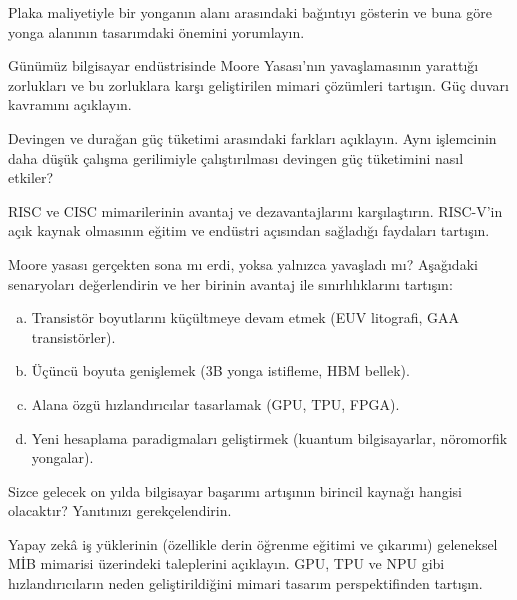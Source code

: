 \begin{alistirma}[\orta]
Plaka maliyetiyle bir yonganın alanı arasındaki bağıntıyı gösterin ve buna göre yonga alanının tasarımdaki önemini yorumlayın.
\end{alistirma}

\begin{alistirma}[\zor]
Günümüz bilgisayar endüstrisinde Moore Yasası'nın yavaşlamasının yarattığı zorlukları ve bu zorluklara karşı geliştirilen mimari çözümleri tartışın. Güç duvarı kavramını açıklayın.
\end{alistirma}

\begin{alistirma}[\orta]
Devingen ve durağan güç tüketimi arasındaki farkları açıklayın. Aynı işlemcinin daha düşük çalışma gerilimiyle çalıştırılması devingen güç tüketimini nasıl etkiler?
\end{alistirma}

\begin{alistirma}[\zor]
RISC ve CISC mimarilerinin avantaj ve dezavantajlarını karşılaştırın. RISC-V'in açık kaynak olmasının eğitim ve endüstri açısından sağladığı faydaları tartışın.
\end{alistirma}

\begin{alistirma}[\zor]
Moore yasası gerçekten sona mı erdi, yoksa yalnızca yavaşladı mı? Aşağıdaki senaryoları değerlendirin ve her birinin avantaj ile sınırlılıklarını tartışın:
\begin{enumerate}[(a)]
    \item Transistör boyutlarını küçültmeye devam etmek (EUV litografi, GAA transistörler).
    \item Üçüncü boyuta genişlemek (3B yonga istifleme, HBM bellek).
    \item Alana özgü hızlandırıcılar tasarlamak (GPU, TPU, FPGA).
    \item Yeni hesaplama paradigmaları geliştirmek (kuantum bilgisayarlar, nöromorfik yongalar).
\end{enumerate}
Sizce gelecek on yılda bilgisayar başarımı artışının birincil kaynağı hangisi olacaktır? Yanıtınızı gerekçelendirin.
\end{alistirma}

\begin{alistirma}[\zor]
Yapay zekâ iş yüklerinin (özellikle derin öğrenme eğitimi ve çıkarımı) geleneksel MİB mimarisi üzerindeki taleplerini açıklayın. GPU, TPU ve NPU gibi hızlandırıcıların neden geliştirildiğini mimari tasarım perspektifinden tartışın.
\end{alistirma}

